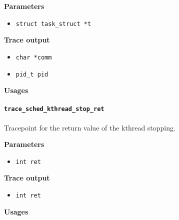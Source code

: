 \textbf{Parameters}
\begin{itemize}
    \item \verb|struct task_struct *t|
\end{itemize}

\textbf{Trace output}
\begin{itemize}
    \item \verb|char *comm|
    \item \verb|pid_t pid|
\end{itemize}

\textbf{Usages}
\begin{code}

\end{code}

\paragraph{\texttt{trace\_sched\_kthread\_stop\_ret}}
Tracepoint for the return value of the kthread stopping.

\textbf{Parameters}
\begin{itemize}
    \item \verb|int ret|
\end{itemize}

\textbf{Trace output}
\begin{itemize}
    \item \verb|int ret|
\end{itemize}

\textbf{Usages}
\begin{code}

\end{code}